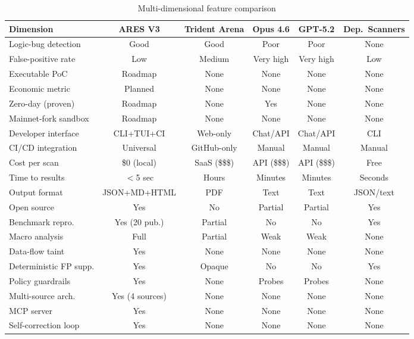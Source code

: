 \documentclass{article}
\begin{document}
\begin{table}[H]
  \caption{Multi-dimensional feature comparison}
  \label{tab:features}
  \centering
  \small
  \begin{tabular}{p{3.2cm}ccccc}
    \toprule
    Dimension & ARES V3 & Trident Arena & Opus 4.6 & GPT-5.2 & Dep.\ Scanners \\
    \midrule
    Logic-bug detection & Good & Good & Poor & Poor & None \\
    False-positive rate & Low & Medium & Very high & Very high & Low \\
    Executable PoC & Roadmap & None & None & None & None \\
    Economic metric & Planned & None & None & None & None \\
    Zero-day (proven) & Roadmap & None & Yes & None & None \\
    Mainnet-fork sandbox & Roadmap & None & None & None & None \\
    Developer interface & CLI+TUI+CI & Web-only & Chat/API & Chat/API & CLI \\
    CI/CD integration & Universal & GitHub-only & Manual & Manual & Manual \\
    Cost per scan & \$0 (local) & SaaS (\$\$\$) & API (\$\$\$) & API (\$\$\$) & Free \\
    Time to results & $<$5 sec & Hours & Minutes & Minutes & Seconds \\
    Output format & JSON+MD+HTML & PDF & Text & Text & JSON/text \\
    Open source & Yes & No & Partial & Partial & Yes \\
    Benchmark repro. & Yes (20 pub.) & Partial & No & No & Yes \\
    Macro analysis & Full & Partial & Weak & Weak & None \\
    Data-flow taint & Yes & None & None & None & None \\
    Deterministic FP supp. & Yes & Opaque & No & No & Yes \\
    Policy guardrails & Yes & None & Probes & Probes & None \\
    Multi-source arch. & Yes (4 sources) & None & None & None & None \\
    MCP server & Yes & None & None & None & None \\
    Self-correction loop & Yes & None & None & None & None \\
    \bottomrule
  \end{tabular}
\end{table}
\end{document}

